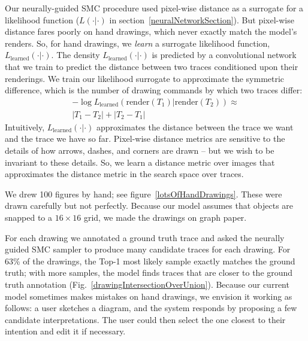\documentclass{article}
\begin{document}
Our neurally-guided SMC procedure
used pixel-wise distance as a surrogate for a likelihood function ($L(\cdot|\cdot)$ in section~\ref{neuralNetworkSection}).
But pixel-wise distance fares poorly on hand drawings, which never exactly match
the model's renders.
So, for hand drawings,
we \emph{learn} a surrogate likelihood function,
$L_{\text{learned}}(\cdot|\cdot)$.
The density $L_{\text{learned}}(\cdot|\cdot)$ is predicted by a convolutional network that we train to predict
the distance between two traces conditioned upon their renderings.
We train our likelihood surrogate to approximate the symmetric difference,
which is  the number of drawing commands by which two traces differ:
\begin{multline}
-\log L_{\text{learned}}(\text{render}(T_1)|\text{render}(T_2))\approx\\ |T_1 - T_2| + |T_2 - T_1|\label{symmetricDistance}
\end{multline}
Intuitively,
$L_{\text{learned}}(\cdot|\cdot)$ approximates the distance between
the trace we want and the trace we have so far.  Pixel-wise distance
metrics are sensitive to the details of how
arrows, dashes, and corners are drawn -- but we wish to be invariant
to these details. So, we learn a distance metric over images that
approximates the distance metric in the search space over traces.


We drew 100 figures by hand; see figure~\ref{lotsOfHandDrawings}.
These were drawn carefully but not perfectly.
Because our model assumes that objects are snapped to a $16\times 16$ grid, 
we made the drawings on graph paper.

For each drawing we annotated a ground truth trace and asked the neurally guided SMC sampler
to produce many candidate traces for each drawing.
For 63\% of the drawings, the Top-1 most likely sample exactly matches the
ground truth; with more samples, the model finds traces
that are closer to the ground truth annotation (Fig.~\ref{drawingIntersectionOverUnion}).
Because our current model sometimes makes mistakes on hand drawings,
we envision it working as follows:
a user sketches a diagram,
and the system responds by proposing a few candidate interpretations.
The user could then select the one closest to their intention and edit it if necessary.
\end{document}
